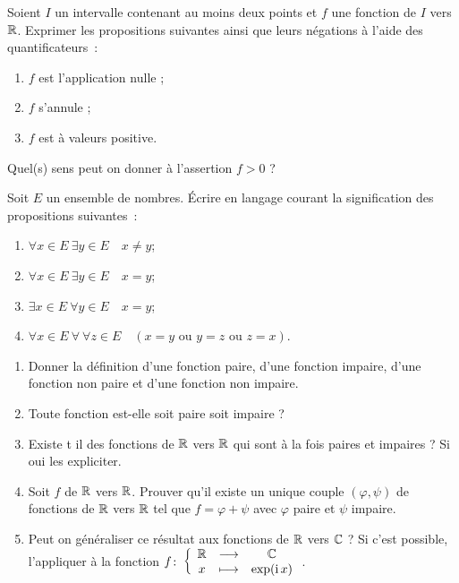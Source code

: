 \begin{exercice}

    Soient \(I\) un intervalle contenant au moins deux points et \(f\) une fonction de \(I\) vers \(\mathbb{R}\). Exprimer les
    propositions suivantes ainsi que leurs négations à l'aide des quantificateurs~:
    \begin{enumerate}
        \item \(f\) est l'application nulle ;
        \item \(f\) s'annule ;
        \item \(f\) est à valeurs positive.
    \end{enumerate}
    Quel(s) sens peut on donner à l'assertion \(f>0\) ?
\end{exercice}
\begin{exercice}
    Soit \(E\) un ensemble de nombres. Écrire en langage courant la signification des propositions suivantes~:
    \begin{enumerate}
        \item \(\forall x \in E \ \exists y \in E \quad x \neq y\);
        \item \(\forall x \in E \ \exists y \in E \quad x = y\);
        \item \(\exists x \in E \ \forall y \in E \quad x = y\);
        \item \(\forall x \in E \ \forall \ \forall z \in E \quad (x=y \textrm{~ou~}
            y=z \textrm{~ou~} z=x)\).
    \end{enumerate}
\end{exercice}
\begin{exercice}

    \begin{enumerate}
        \item Donner la définition d'une fonction paire, d'une fonction impaire,
            d'une fonction non paire et d'une fonction non impaire.
        \item Toute fonction est-elle soit paire soit impaire ?
        \item Existe t il des fonctions de \(\mathbb{R}\) vers \(\mathbb{R}\) qui sont à la fois
            paires  et impaires ? Si oui les expliciter.
        \item Soit \(f\) de \(\mathbb{R}\) vers \(\mathbb{R}\). Prouver qu'il existe un unique
            couple \((\varphi, \psi)\) de fonctions de \(\mathbb{R}\) vers \(\mathbb{R}\) tel que
            \(f=\varphi+\psi\) avec \(\varphi\) paire et \(\psi\) impaire.
        \item Peut on généraliser ce résultat aux fonctions de \(\mathbb{R}\) vers \(\mathbb{C}\) ?
            Si c'est possible, l'appliquer à la fonction
            \(f\colon \left\{\begin{array}{ccc} \mathbb{R} & \longrightarrow &\mathbb{C}\\ x & \longmapsto & \exp(\operatorname{i} x) \end{array} \right.\).
    \end{enumerate}
\end{exercice}
